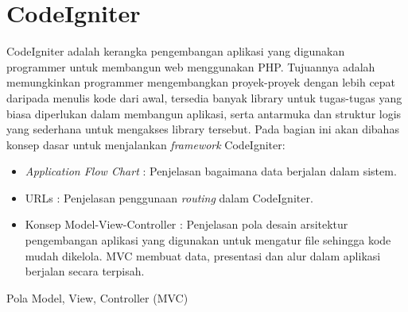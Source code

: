 \section{CodeIgniter}
\label{sec:codeigniter}
CodeIgniter adalah kerangka pengembangan aplikasi yang digunakan programmer untuk membangun web menggunakan PHP. Tujuannya adalah memungkinkan programmer mengembangkan proyek-proyek dengan lebih cepat daripada  menulis kode dari awal, tersedia banyak library untuk tugas-tugas yang biasa diperlukan dalam membangun aplikasi, serta antarmuka dan struktur logis yang sederhana untuk mengakses library tersebut. 
Pada bagian ini akan dibahas konsep dasar untuk menjalankan \textit{framework} CodeIgniter:
\begin{itemize}
	\item \textit{Application Flow Chart} : Penjelasan bagaimana data berjalan dalam sistem.
	\item URLs : Penjelasan penggunaan \textit{routing} dalam CodeIgniter.
	\item Konsep Model-View-Controller : Penjelasan pola desain arsitektur pengembangan aplikasi yang digunakan untuk mengatur file sehingga kode mudah dikelola. MVC membuat data, presentasi dan alur dalam aplikasi berjalan secara terpisah.
\end{itemize}
Pola Model, View, Controller (MVC) 

